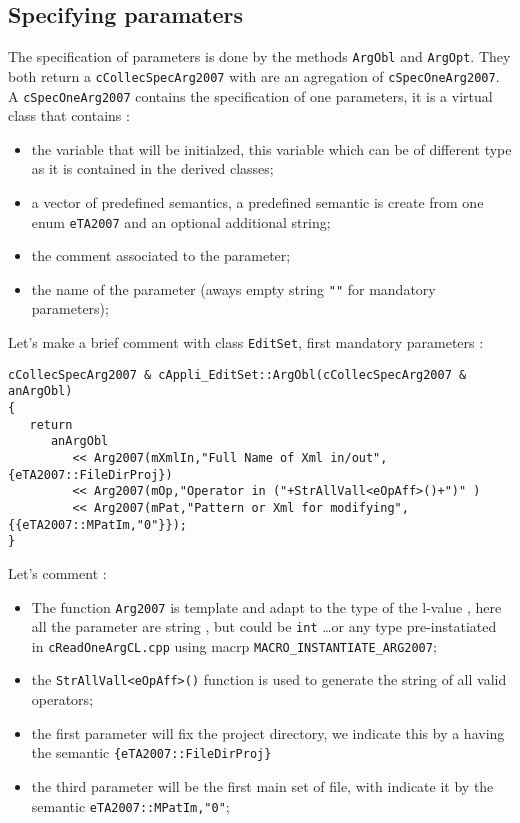 \subsection{Specifying paramaters}


The specification of parameters is done by the methods {\tt ArgObl} and {\tt ArgOpt}.
They both return a {\tt cCollecSpecArg2007} with are an agregation of {\tt cSpecOneArg2007}.
A {\tt cSpecOneArg2007} contains the specification of one parameters, it is
a virtual class that contains :

\begin{itemize}
   \item  the variable that will be initialzed, this variable which can be of different type
          as it is contained in the derived classes;

   \item  a vector of predefined semantics, a predefined semantic is create from one
          enum {\tt eTA2007} and an optional additional string;
   \item  the comment associated to the parameter;
   \item  the name of the parameter (aways empty string {\tt ""} for mandatory parameters);
\end{itemize}

Let's make a brief comment with class {\tt EditSet}, first mandatory parameters :

{\small
\begin{verbatim}
cCollecSpecArg2007 & cAppli_EditSet::ArgObl(cCollecSpecArg2007 & anArgObl)
{
   return
      anArgObl
         << Arg2007(mXmlIn,"Full Name of Xml in/out",{eTA2007::FileDirProj})
         << Arg2007(mOp,"Operator in ("+StrAllVall<eOpAff>()+")" )
         << Arg2007(mPat,"Pattern or Xml for modifying",{{eTA2007::MPatIm,"0"}});
}
\end{verbatim}
}

Let's comment :

\begin{itemize}
   \item The function {\tt Arg2007} is template and adapt to the type of the
         l-value , here all the parameter are string , but could be {\tt int} \dots or
         any type pre-instatiated in {\tt cReadOneArgCL.cpp} using macrp {\tt MACRO\_INSTANTIATE\_ARG2007};

   \item the {\tt StrAllVall<eOpAff>()} function is used to generate the string of all valid operators;

   \item the first parameter will fix the project directory, we indicate this by a having
         the semantic {\tt  \{eTA2007::FileDirProj\}}

   \item the third parameter will be the first main set of file, with indicate it by
         the semantic {\tt {eTA2007::MPatIm,"0"}};
\end{itemize}

